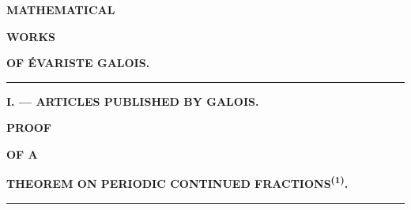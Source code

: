 
\providecommand{\GalSourcePageStart}[4]{}%
\providecommand{\GalSourcePageBoundary}[4]{\space}%
\providecommand{\GalSourcePageBoundaryInWord}[4]{}%
\providecommand{\GalPrintedError}[2]{#1}%
\providecommand{\GalCopySpecificMarkImage}[4]{}%
\providecommand{\GalPrinterSignature}[1]{}%
\providecommand{\GalArticleEndRule}{\par\smallskip\begin{center}\rule{0.18\linewidth}{0.4pt}\end{center}}%
\providecommand{\GalHistoricalFootnote}[1]{\footnote{#1}}%

\makeatletter
{}%
%
%
%
\makeatother

\GalSourcePageStart{030}{L0029}{1}{1}

\begin{center}
{\Large\bfseries MATHEMATICAL\par}
\vspace{0.8em}
{\small\bfseries WORKS\par}
\vspace{0.8em}
{\LARGE\bfseries OF ÉVARISTE GALOIS.\par}
\vspace{1.5em}
\rule{0.70\linewidth}{0.4pt}\par
\vspace{1.6em}
{\large\bfseries I. — ARTICLES PUBLISHED BY GALOIS.\par}
\vspace{1.6em}
{\bfseries PROOF\par}
\vspace{0.45em}
{\scriptsize\bfseries OF A\par}
\vspace{0.45em}
{\bfseries THEOREM ON PERIODIC CONTINUED FRACTIONS\textsuperscript{(1)}.\par}
\GalCopySpecificMarkImage{030}{L0029}{copy-specific non-letterpress mark beside article title}{figures/PDF030_L0029_TITLE_MARK_ENHANCED.png}%
\vspace{0.7em}
\rule{0.12\linewidth}{0.4pt}
\end{center}

